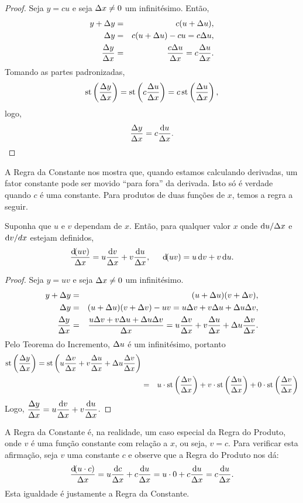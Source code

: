 \begin{proof} Seja $y = cu$ e seja $\Delta x \ne 0$ um infinitésimo. Então,
\begin{eqnarray*}
  y + \Delta y & = & c(u + \Delta u), \\
  \Delta y & = & c(u + \Delta u) - cu = c \Delta u, \\
  \frac{\Delta y}{\Delta x} & = & \frac{c \Delta u}{\Delta x} = c \frac{\Delta u}{\Delta x}.
\end{eqnarray*}
Tomando as partes padronizadas,
$$
  \operatorname{st}\left(\frac{\Delta y}{\Delta x}\right) = \operatorname{st}\left(c\frac{\Delta u}{\Delta x}\right) = c \operatorname{st}\left(\frac{\Delta u}{\Delta x}\right),
$$
logo, $$\displaystyle \frac{\dy}{\dx} = c \frac{\du}{\dx}.$$
\end{proof}

A Regra da Constante nos mostra que, quando estamos calculando derivadas,
um fator constante pode ser movido ``para fora'' da derivada. Isto só é
verdade quando $c$ é uma constante. Para produtos de duas funções de $x$,
temos a regra a seguir.

\begin{theorem}
Suponha que $u$ e $v$ dependam de $x$. Então, para qualquer valor $x$ onde
$\du/\dx$ e $\dv/dx$ estejam definidos,
$$
  \frac{\dif(u v)}{\dx} = u \frac{\dv}{\dx} + v \frac{\du}{\dx},
  \hspace{1.5em}
  \dif(u v) = u \dv + v \du.
$$
\end{theorem}

\begin{proof}
Seja $y = uv$ e seja $\Delta x \ne 0$ um infinitésimo.
\begin{eqnarray*}
  y + \Delta y & = & (u + \Delta u)(v + \Delta v), \\
  \Delta y & = & (u + \Delta u)(v + \Delta v) - uv = u \Delta v + v \Delta u + \Delta u \Delta v, \\
  \frac{\Delta y}{\Delta x} & = & \frac{u \Delta v + v \Delta u + \Delta u \Delta v}{\Delta x} =
    u \frac{\Delta v}{\Delta x} + v \frac{\Delta u}{\Delta x} + \Delta u \frac{\Delta v}{\Delta x}.
\end{eqnarray*}
Pelo Teorema do Incremento, $\Delta u$ é um infinitésimo, portanto
\begin{eqnarray*}
  \operatorname{st}\left(\frac{\Delta y}{\Delta x}\right) = \operatorname{st}\left(u \frac{\Delta v}{\Delta x} + v \frac{\Delta u}{\Delta x} + \Delta u \frac{\Delta v}{\Delta x}\right) \\
  & = & u \cdot \operatorname{st}\left(\frac{\Delta v}{\Delta x}\right) + v \cdot \operatorname{st}\left(\frac{\Delta u}{\Delta x}\right) + 0 \cdot \operatorname{st}\left(\frac{\Delta v}{\Delta x}\right)
\end{eqnarray*}
Logo, $\displaystyle \frac{\dy}{\dx} = u \frac{\dv}{\dx} + v \frac{\du}{\dx}$.
\end{proof}

A Regra da Constante é, na realidade, um caso especial da Regra do Produto,
onde $v$ é uma função constante com relação a $x$, ou seja, $v = c$. Para
verificar esta afirmação, seja $v$ uma constante $c$ e observe que a
Regra do Produto nos dá:
$$
  \frac{\dif(u \cdot c)}{\dx} = u \frac{\dif c}{\dx} + c \frac{\du}{\dx}
    = u \cdot 0 + c \frac{\du}{\dx} = c \frac{\du}{\dx}.
$$
Esta igualdade é justamente a Regra da Constante.

